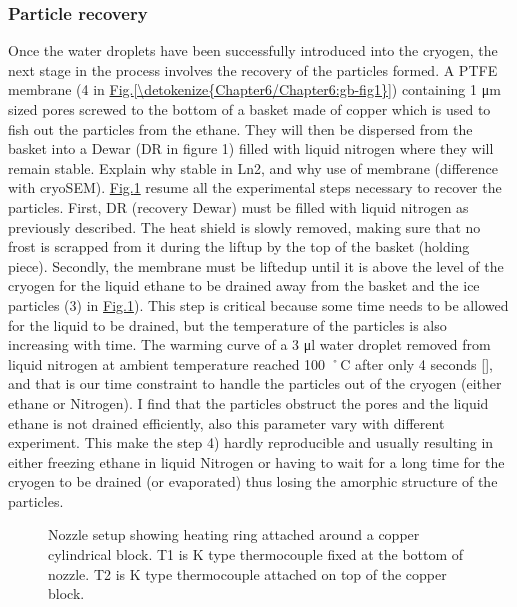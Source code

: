 \documentclass[letterpaper,10pt,english]{jupyterBook}
\begin{document}
\subsubsection{Particle recovery}
\label{\detokenize{Chapter6/Chapter6:particle-recovery}}
\sphinxAtStartPar
Once the water droplets have been successfully introduced into the cryogen, the next stage in the process involves the recovery of the particles formed. A PTFE membrane (4 in \hyperref[\detokenize{Chapter6/Chapter6:gb-fig1}]{Fig.\@ \ref{\detokenize{Chapter6/Chapter6:gb-fig1}}}) containing 1 μm sized pores screwed to the bottom of a basket made of copper which is used to fish out the particles from the ethane. They will then be dispersed from the basket into a Dewar (DR in figure 1) filled with liquid nitrogen where they will remain stable. Explain why stable in Ln2, and why use of membrane (difference with cryo\sphinxhyphen{}SEM).
\hyperref[\detokenize{Chapter6/Chapter6:gb-fig8}]{Fig.\@ \ref{\detokenize{Chapter6/Chapter6:gb-fig8}}} resume all the experimental steps necessary to recover the particles. First, DR (recovery Dewar) must be filled with liquid nitrogen as previously described. The heat shield is slowly removed, making sure that no frost is scrapped from it during the lift\sphinxhyphen{}up by the top of the basket (holding piece). Secondly, the membrane must be lifted\sphinxhyphen{}up until it is above the level of the cryogen for the liquid ethane to be drained away from the basket and the ice particles (3) in \hyperref[\detokenize{Chapter6/Chapter6:gb-fig8}]{Fig.\@ \ref{\detokenize{Chapter6/Chapter6:gb-fig8}}}). This step is critical because some time needs to be allowed for the liquid to be drained, but the temperature of the particles is also increasing with time.
The warming curve of a 3 μl water droplet removed from liquid nitrogen at ambient temperature reached \sphinxhyphen{}100 ˚C after only 4 seconds {[}{]}, and that is our time constraint to handle the particles out of the cryogen (either ethane or Nitrogen).
I find that the particles obstruct the pores and the liquid ethane is not drained efficiently, also this parameter vary with different experiment. This make the step 4) hardly reproducible and usually resulting in either freezing ethane in liquid Nitrogen or having to wait for a long time for the cryogen to be drained (or evaporated) thus losing the amorphic structure of the particles.

\begin{figure}[htbp]
\centering
\capstart

\noindent{}
\caption{Nozzle setup showing heating ring attached around a copper cylindrical block. T1 is K type thermocouple fixed at the bottom of nozzle. T2 is K type thermocouple attached on top of the copper block.}\label{\detokenize{Chapter6/Chapter6:gb-fig8}}\end{figure}
\end{document}
